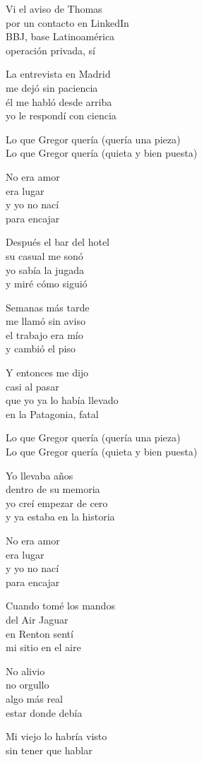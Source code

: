 \begin{lyrics}
Vi el aviso de Thomas\\
por un contacto en LinkedIn\\
BBJ, base Latinoamérica\\
operación privada, sí

La entrevista en Madrid\\
me dejó sin paciencia\\
él me habló desde arriba\\
yo le respondí con ciencia

Lo que Gregor quería
(quería una pieza)\\
Lo que Gregor quería
(quieta y bien puesta)

No era amor\\
era lugar\\
y yo no nací\\
para encajar

Después el bar del hotel\\
su casual me sonó\\
yo sabía la jugada\\
y miré cómo siguió

Semanas más tarde\\
me llamó sin aviso\\
el trabajo era mío\\
y cambió el piso

Y entonces me dijo\\
casi al pasar\\
que yo ya lo había llevado\\
en la Patagonia, fatal

Lo que Gregor quería
(quería una pieza)\\
Lo que Gregor quería
(quieta y bien puesta)

Yo llevaba años\\
dentro de su memoria\\
yo creí empezar de cero\\
y ya estaba en la historia

No era amor\\
era lugar\\
y yo no nací\\
para encajar

Cuando tomé los mandos\\
del Air Jaguar\\
en Renton sentí\\
mi sitio en el aire

No alivio\\
no orgullo\\
algo más real\\
estar donde debía

Mi viejo lo habría visto\\
sin tener que hablar
\end{lyrics}

